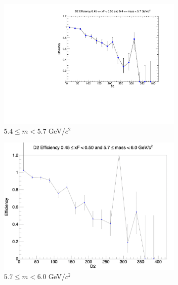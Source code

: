 \documentclass[11pt]{article}
\begin{document}
\begin{figure}[p]
\begin{subfigure}[b]{0.32\textwidth}
        \includegraphics[width=\textwidth]{./kTrackerEfficiencyPlots/D2_Efficiency_xF9_mass4.pdf}
        \caption{$5.4 \leq m < 5.7$ GeV/$c^2$}
    \end{subfigure}\hfill
    \begin{subfigure}[b]{0.32\textwidth}
        \centering
        \includegraphics[width=\textwidth]{./kTrackerEfficiencyPlots/D2_Efficiency_xF9_mass5.png}
        \caption{$5.7 \leq m < 6.0$ GeV/$c^2$}
    \end{subfigure}\vspace{0.5cm}
    \begin{subfigure}[b]{0.32\textwidth}
        \centering

\end{subfigure}
\end{figure}
\end{document}
